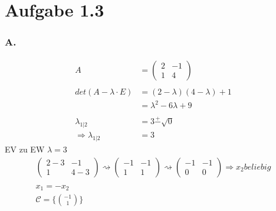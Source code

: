 \documentclass{article} %
\begin{document}
\section{Aufgabe 1.3}
\subsubsection{A.}
\begin{align*}
    A & = \begin{pmatrix}2 & -1 \\ 1 & 4 \end{pmatrix} \\ \\
    det(A - \lambda \cdot E) & = (2-\lambda) (4-\lambda) +1 \\
    & = \lambda^2 - 6 \lambda +9 \\ \\
    \lambda_{1|2} & = 3 \overset{+}{-} \sqrt{0} \\
    \Rightarrow \lambda_{1|2} & = 3
\end{align*}
EV zu EW $\lambda = 3$
\begin{align*}
    \begin{pmatrix}
    2-3 & -1 \\ 1 & 4-3
    \end{pmatrix} \rightsquigarrow \begin{pmatrix}
    -1 & -1 \\ 1 & 1 
    \end{pmatrix} \rightsquigarrow \begin{pmatrix}
    -1 & -1  \\ 0 & 0 
    \end{pmatrix} \Rightarrow x_2 beliebig  \\ \\
    x_1 = -x_2 \\ 
    \mathcal{C} = \Biggl \{ \binom{-1}{1} \Biggr \}
\end{align*}
\end{document}
